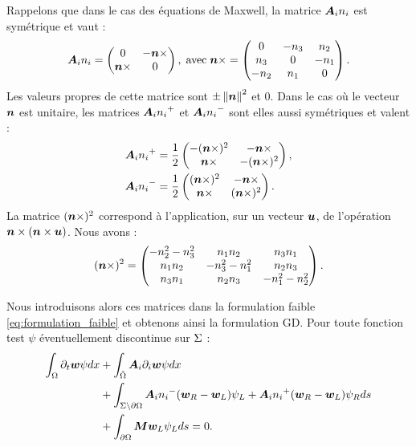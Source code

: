 Rappelons que dans le cas des équations de Maxwell,
la matrice ${\bm{A}_{i}n_{i}}$ est symétrique et vaut :
\begin{align}
	{\bm{A}_{i}n_{i}} = 
	\begin{pmatrix}
		0 & -\bm{n} \times \\
		\bm{n} \times & 0
	\end{pmatrix} ,
	\; \mathrm{avec} \;
	\bm{n} \times =
	\begin{pmatrix}
		0 & -n_{3} & n_{2} \\
		n_{3} & 0 & -n_{1} \\
		-n_{2} & n_{1} & 0
	\end{pmatrix} .
\end{align}
Les valeurs propres de cette matrice sont $\pm \left\Vert\bm{n}\right\Vert^2$ et $0$.
Dans le cas où le vecteur $\bm{n}$ est unitaire, les matrices ${\bm{A}_{i}n_{i}}^{+}$ et
${\bm{A}_{i}n_{i}}^{-}$ sont elles aussi symétriques et valent :
\begin{subequations}
	\begin{align}
		{\bm{A}_{i}n_{i}}^{+} &= \frac{1}{2}
		\begin{pmatrix}
			-(\bm{n} \times)^2 & -\bm{n} \times \\
			\bm{n} \times & -(\bm{n} \times)^2
		\end{pmatrix} ,
		\\
		{\bm{A}_{i}n_{i}}^{-} &= \frac{1}{2}
		\begin{pmatrix}
			(\bm{n} \times)^2 & -\bm{n} \times \\
			\bm{n} \times & (\bm{n} \times)^2
		\end{pmatrix} .
	\end{align}
\end{subequations}
La matrice $(\bm{n} \times)^2$ correspond à l'application, sur un vecteur $\bm{u}$,
de l'opération $\bm{n} \times (\bm{n} \times \bm{u})$. Nous avons :
\begin{align}
	(\bm{n} \times)^2 = \begin{pmatrix}
	- n_{2}^2 - n_{3}^2 & n_{1} n_{2} & n_{3} n_{1} \\
	n_{1} n_{2} & - n_{3}^2 - n_{1}^2 & n_{2} n_{3} \\
	n_{3} n_{1} & n_{2} n_{3} & - n_{1}^2 - n_{2}^2
	\end{pmatrix} .
\end{align}

Nous introduisons alors ces matrices dans la formulation faible
\eqref{eq:formulation_faible} et obtenons ainsi la formulation GD.
Pour toute fonction test $\psi$ éventuellement discontinue sur
$\Sigma$ :
\begin{equation}
	\begin{aligned}
		\int_{\Omega} \partial_{t} \bm{w} \psi dx
		&+ \int_{\tilde{\Omega}} {\bm{A}_{i}\partial_{i}} \bm{w} \psi dx \\
		&+ \int_{\Sigma \setminus \partial\Omega}
			{\bm{A}_{i}n_{i}}^{-} (\bm{w}_R - \bm{w}_L) \psi_L +
			{\bm{A}_{i}n_{i}}^{+} (\bm{w}_R - \bm{w}_L) \psi_R ds \\
		&+ \int_{\partial\Omega} \bm{M} \bm{w}_L \psi_L ds = 0
		\label{eq:formulation_gd} .
	\end{aligned}
\end{equation}


